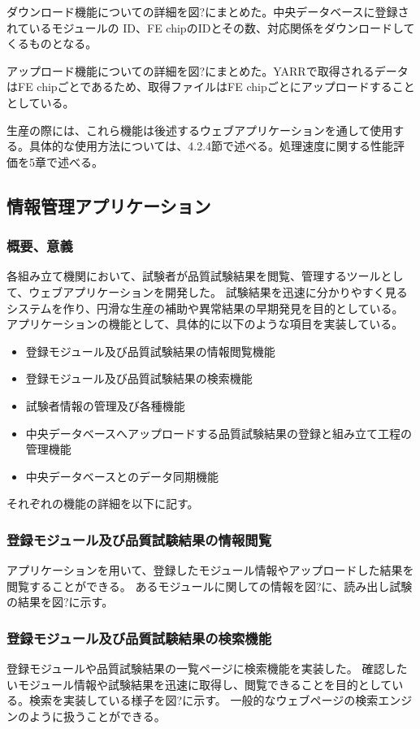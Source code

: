 ダウンロード機能についての詳細を図?にまとめた。中央データベースに登録されているモジュールの ID、FE chipのIDとその数、対応関係をダウンロードしてくるものとなる。

アップロード機能についての詳細を図?にまとめた。YARRで取得されるデータはFE chipごとであるため、取得ファイルはFE chipごとにアップロードすることとしている。

生産の際には、これら機能は後述するウェブアプリケーションを通して使用する。具体的な使用方法については、4.2.4節で述べる。処理速度に関する性能評価を5章で述べる。

\subsection{情報管理アプリケーション}
\subsubsection{概要、意義}
各組み立て機関において、試験者が品質試験結果を閲覧、管理するツールとして、ウェブアプリケーションを開発した。
試験結果を迅速に分かりやすく見るシステムを作り、円滑な生産の補助や異常結果の早期発見を目的としている。
アプリケーションの機能として、具体的に以下のような項目を実装している。

\begin{itemize}
  \item 登録モジュール及び品質試験結果の情報閲覧機能
  \item 登録モジュール及び品質試験結果の検索機能
  \item 試験者情報の管理及び各種機能
  \item 中央データベースへアップロードする品質試験結果の登録と組み立て工程の管理機能
  \item 中央データベースとのデータ同期機能
\end{itemize}

それぞれの機能の詳細を以下に記す。

\subsubsection{登録モジュール及び品質試験結果の情報閲覧}
アプリケーションを用いて、登録したモジュール情報やアップロードした結果を閲覧することができる。
あるモジュールに関しての情報を図?に、読み出し試験の結果を図?に示す。

\subsubsection{登録モジュール及び品質試験結果の検索機能}
登録モジュールや品質試験結果の一覧ページに検索機能を実装した。
確認したいモジュール情報や試験結果を迅速に取得し、閲覧できることを目的としている。検索を実装している様子を図?に示す。
一般的なウェブページの検索エンジンのように扱うことができる。

